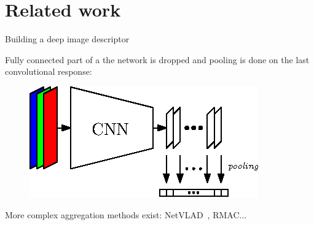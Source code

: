 \section{Related work}

\label{sec:related_work}

\begin{frame}{Building a deep image descriptor}

	Fully connected part of a the network is dropped and pooling is done on the last convolutional response:
	\vfill
	\begin{figure}
		\centering
		\includegraphics[width=0.8\linewidth]{vect/MAC.eps}			
	\end{figure}
	\vfill
	More complex aggregation methods exist: NetVLAD~\cite{Arandjelovic2017}, RMAC...
\end{frame}

